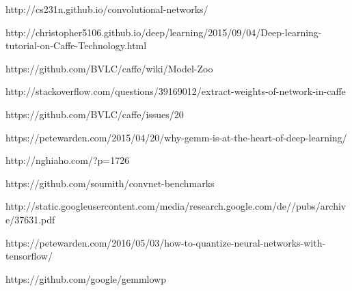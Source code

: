 \documentclass[12pt]{article}
\begin{document}
\clearpage
\begin{thebibliography}{9}

\bibitem{} 
http://cs231n.github.io/convolutional-networks/

\bibitem{} 
http://christopher5106.github.io/deep/learning/2015/09/04/Deep-learning-tutorial-on-Caffe-Technology.html

\bibitem{} 
https://github.com/BVLC/caffe/wiki/Model-Zoo

\bibitem{} 
http://stackoverflow.com/questions/39169012/extract-weights-of-network-in-caffe

\bibitem{} 
https://github.com/BVLC/caffe/issues/20

https://petewarden.com/2015/04/20/why-gemm-is-at-the-heart-of-deep-learning/

\bibitem{} 
http://nghiaho.com/?p=1726

\bibitem{} 
https://github.com/soumith/convnet-benchmarks

\bibitem{} 
http://static.googleusercontent.com/media/research.google.com/de//pubs/archive/37631.pdf

\bibitem{} 
https://petewarden.com/2016/05/03/how-to-quantize-neural-networks-with-tensorflow/

\bibitem{} 
https://github.com/google/gemmlowp

\end{thebibliography}
\end{document}
